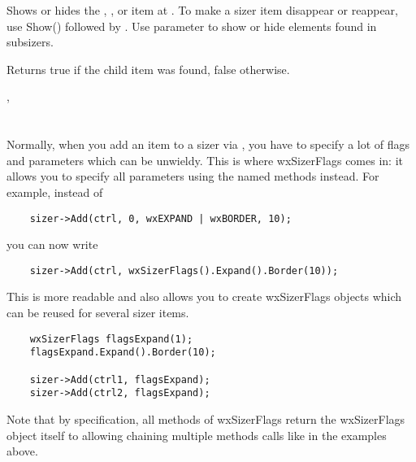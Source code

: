 

Shows or hides the , , or item at .
To make a sizer item disappear or reappear, use Show() followed by .
Use parameter  to show or hide elements found in subsizers.

Returns true if the child item was found, false otherwise.


,\rtfsp
{}




\section{}\label{wxsizerflags}

Normally, when you add an item to a sizer via 
, you have to specify a lot of flags and
parameters which can be unwieldy. This is where wxSizerFlags comes in: it
allows you to specify all parameters using the named methods instead. For
example, instead of

\begin{verbatim}
    sizer->Add(ctrl, 0, wxEXPAND | wxBORDER, 10);
\end{verbatim}

you can now write

\begin{verbatim}
    sizer->Add(ctrl, wxSizerFlags().Expand().Border(10));
\end{verbatim}

This is more readable and also allows you to create wxSizerFlags objects which
can be reused for several sizer items.
\begin{verbatim}
    wxSizerFlags flagsExpand(1);
    flagsExpand.Expand().Border(10);

    sizer->Add(ctrl1, flagsExpand);
    sizer->Add(ctrl2, flagsExpand);
\end{verbatim}

Note that by specification, all methods of wxSizerFlags return the wxSizerFlags
object itself to allowing chaining multiple methods calls like in the examples
above.


\label{wxsizerflagsctor}

